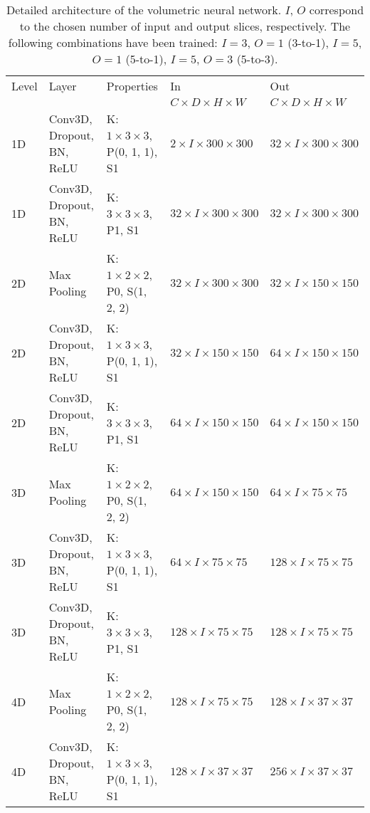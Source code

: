 \begin{sidewaystable}[htbp]
   \centering
   \caption[Architecture of FCNN 3D Volumetric]{Detailed architecture of the volumetric neural network. $I$, $O$ correspond to the chosen number of input and output slices, respectively. The following combinations have been trained: $I = 3$, $O = 1$ (3-to-1), $I = 5$, $O = 1$ (5-to-1), $I = 5$, $O = 3$ (5-to-3).}
   \begin{tabular}{l*{4}{l}}
      \toprule
      Level	& Layer				& Properties 					& In							& Out									\\
      &							&								& $C \times D \times H \times W$& $C \times D \times H \times W$		\\
      \midrule
      1D	& Conv3D, Dropout, BN, ReLU & K: $1 \times 3 \times 3$, P(0, 1, 1), S1	& $2 \times I \times 300 \times 300$	& $32 \times I \times 300 \times 300$	\\
      1D	& Conv3D, Dropout, BN, ReLU & K: $3 \times 3 \times 3$, P1, S1			& $32 \times I \times 300 \times 300$	& $32 \times I \times 300 \times 300$	\\
      2D	& Max Pooling				& K: $1 \times 2 \times 2$, P0, S(1, 2, 2)	& $32 \times I \times 300 \times 300$	& $32 \times I \times 150 \times 150$	\\
      2D	& Conv3D, Dropout, BN, ReLU & K: $1 \times 3 \times 3$, P(0, 1, 1), S1	& $32 \times I \times 150 \times 150$	& $64 \times I \times 150 \times 150$	\\
      2D	& Conv3D, Dropout, BN, ReLU & K: $3 \times 3 \times 3$, P1, S1			& $64 \times I \times 150 \times 150$	& $64 \times I \times 150 \times 150$	\\
      3D	& Max Pooling				& K: $1 \times 2 \times 2$, P0, S(1, 2, 2)	& $64 \times I \times 150 \times 150$	& $64 \times I \times 75 \times 75$		\\
      3D	& Conv3D, Dropout, BN, ReLU & K: $1 \times 3 \times 3$, P(0, 1, 1), S1	& $64 \times I \times 75 \times 75$		& $128 \times I \times 75 \times 75$	\\
      3D	& Conv3D, Dropout, BN, ReLU & K: $3 \times 3 \times 3$, P1, S1			& $128 \times I \times 75 \times 75$	& $128 \times I \times 75 \times 75$	\\
      4D	& Max Pooling				& K: $1 \times 2 \times 2$, P0, S(1, 2, 2)	& $128 \times I \times 75 \times 75$	& $128 \times I \times 37 \times 37$	\\
      4D	& Conv3D, Dropout, BN, ReLU & K: $1 \times 3 \times 3$, P(0, 1, 1), S1	& $128 \times I \times 37 \times 37$	& $256 \times I \times 37 \times 37$	\\

\end{tabular}
\end{sidewaystable}
